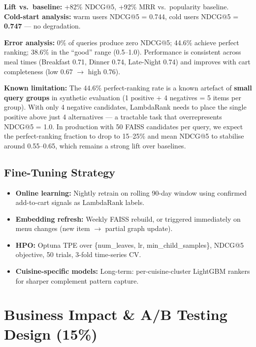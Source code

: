 \documentclass[11pt,a4paper]{article}
\newcommand{\TO}{$\rightarrow$}
\begin{document}
\smallskip
\textbf{Lift vs.\ baseline:} +82\% NDCG@5, +92\% MRR vs.\ popularity baseline.\\
\textbf{Cold-start analysis:} warm users NDCG@5 = 0.744, cold users NDCG@5 = \textbf{0.747} --- no degradation.

\textbf{Error analysis:}
0\% of queries produce zero NDCG@5;
44.6\% achieve perfect ranking;
38.6\% in the ``good'' range (0.5--1.0).
Performance is consistent across meal times (Breakfast 0.71, Dinner 0.74,
Late-Night 0.74) and improves with cart completeness
(low 0.67 \TO{} high 0.76).

\medskip
\textbf{Known limitation:}
The 44.6\% perfect-ranking rate is a known artefact of \textbf{small
query groups} in synthetic evaluation (1 positive + 4 negatives = 5 items
per group). With only 4 negative candidates, LambdaRank needs to place
the single positive above just 4 alternatives --- a tractable task that
overrepresents NDCG@5 = 1.0.
In production with 50 FAISS candidates per query, we expect the
perfect-ranking fraction to drop to 15--25\% and mean NDCG@5 to
stabilise around 0.55--0.65, which remains a strong lift over baselines.

\subsection{Fine-Tuning Strategy}

\begin{itemize}[noitemsep, leftmargin=*]
  \item \textbf{Online learning:} Nightly retrain on rolling 90-day window
    using confirmed add-to-cart signals as LambdaRank labels.
  \item \textbf{Embedding refresh:} Weekly FAISS rebuild, or triggered
    immediately on menu changes (new item \TO{} partial graph update).
  \item \textbf{HPO:} Optuna TPE over \{num\_leaves, lr, min\_child\_samples\},
    NDCG@5 objective, 50 trials, 3-fold time-series CV.
  \item \textbf{Cuisine-specific models:} Long-term: per-cuisine-cluster
    LightGBM rankers for sharper complement pattern capture.
\end{itemize}

\section{Business Impact \& A/B Testing Design (15\%)}
\end{document}
